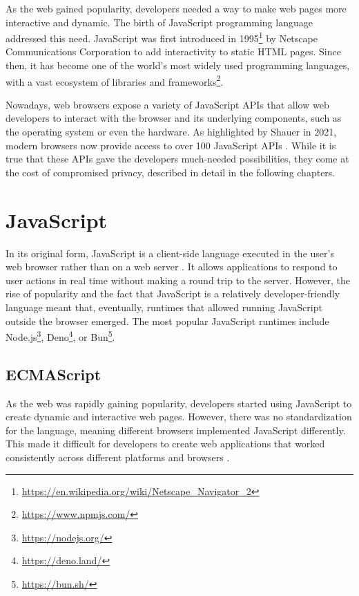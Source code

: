 As the web gained popularity, developers needed a way to make web pages more interactive and dynamic. The birth of JavaScript programming language addressed this need. JavaScript was first introduced in 1995\footnote{\url{https://en.wikipedia.org/wiki/Netscape_Navigator_2}} by Netscape Communications Corporation to add interactivity to static HTML pages. Since then, it has become one of the world's most widely used programming languages, with a vast ecosystem of libraries and frameworks\footnote{\url{https://www.npmjs.com/}}.

Nowadays, web browsers expose a variety of JavaScript APIs that allow web developers to interact with the browser and its underlying components, such as the operating system or even the hardware. As highlighted by Shauer in 2021, modern browsers now provide access to over 100 JavaScript APIs \cite{SchauerDP}. While it is true that these APIs gave the developers much-needed possibilities, they come at the cost of compromised privacy, described in detail in the following chapters.

\section{JavaScript}
\label{Section:JS}

In its original form, JavaScript is a client-side language executed in the user's web browser rather than on a web server \cite{JSDefinitiveGuide}. It allows applications to respond to user actions in real time without making a round trip to the server. However, the rise of popularity and the fact that JavaScript is a relatively developer-friendly language meant that, eventually, runtimes that allowed running JavaScript outside the browser emerged. The most popular JavaScript runtimes include Node.js\footnote{\url{https://nodejs.org/}}, Deno\footnote{\url{https://deno.land/}}, or Bun\footnote{\url{https://bun.sh/}}.

\subsection{ECMAScript}

As the web was rapidly gaining popularity, developers started using JavaScript to create dynamic and interactive web pages. However, there was no standardization for the language, meaning different browsers implemented JavaScript differently. This made it difficult for developers to create web applications that worked consistently across different platforms and browsers \cite{JSDefinitiveGuide}.

